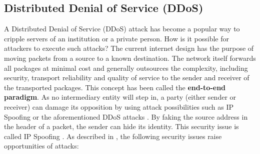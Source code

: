 \subsection{Distributed Denial of Service (DDoS)}
\label{subsec:03_ddos}


A Distributed Denial of Service (DDoS) attack has become a popular way to cripple servers of an institution or a private person. How is it possible for attackers to execute such attacks? The current internet design has the purpose of moving packets from a source to a known destination. The network itself forwards all packages at minimal cost and generally outsources the complexity, including security, transport reliability and quality of service to the sender and receiver of the transported packages. This concept has been called the \textbf{end-to-end paradigm}. As no intermediary entity will step in, a party (either sender or receiver) can damage its opposition by using attack possibilities such as IP Spoofing or the aforementioned DDoS attacks \cite{Mirkovic2004}. By faking the source address in the header of a packet, the sender can hide its identity. This security issue is called IP Spoofing \cite{Cloudflare2019}. As described in \cite{Mirkovic2004}, the following security issues raise opportunities of attacks:

